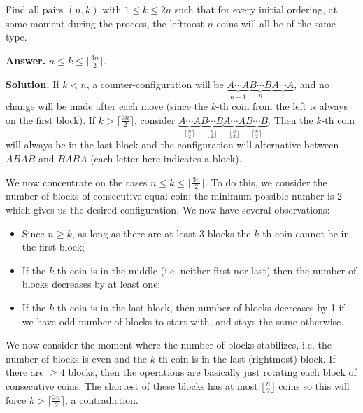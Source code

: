 \documentclass[11pt,a4paper]{article}
\begin{document}
\begin{enumerate}
    	Find all pairs $(n,k)$ with $1 \leq k \leq 2n$ such that for every initial ordering, at some moment during the process, the leftmost $n$ coins will all be of the same type.
    	
    	\textbf{Answer.} 
    	$n\le k\le \lceil \frac {3n}{2}\rceil$. 
    	
    	\textbf{Solution.} 
    	If $k < n$, a counter-configuration will be $\underbrace{A\cdots A}_{n - 1} \underbrace{B\cdots B}_{n} \underbrace{A\cdots A}_{1}$, 
    	and no change will be made after each move (since the $k$-th coin from the left is always on the first block). 
    	If $k > \lceil \frac {3n}{2}\rceil$, 
    	consider $\underbrace{A\cdots A}_{\lceil \frac n2\rceil}
    	\underbrace{B\cdots B}_{\lfloor \frac n2\rfloor}
    	\underbrace{A\cdots A}_{\lfloor \frac n2\rfloor}
    	\underbrace{B\cdots B}_{\lceil \frac n2\rceil}$. 
    	Then the $k$-th coin will always be in the last block 
    	and the configuration will alternative between $ABAB$ and $BABA$ (each letter here indicates a block). 
    	
    	We now concentrate on the cases $n\le k\le \lceil \frac {3n}{2}\rceil$. 
    	To do this, we consider the number of blocks of consecutive equal coin; 
    	the minimum possible number is 2 which gives us the desired configuration. 
    	We now have several observations: 
    	\begin{itemize}
    		\item Since $n\ge k$, as long as there are at least 3 blocks the $k$-th coin cannot be in the first block; 
    		
    		\item If the $k$-th coin is in the middle (i.e. neither first nor last) then the number of blocks decreases by at least one; 
    		
    		\item If the $k$-th coin is in the last block, then number of blocks decreases by 1 if we have odd number of blocks to start with, 
    		and stays the same otherwise. 
    	\end{itemize}
        
        We now consider the moment where the number of blocks stabilizes, i.e. the number of blocks is even and the $k$-th coin is in the last (rightmost) block. 
        If there are $\ge 4$ blocks, 
        then the operations are basically just rotating each block of consecutive coins. 
        The shortest of these blocks has at most $\lfloor \frac n2\rfloor$ coins so this will force $k > \lceil \frac {3n}{2}\rceil$, 
        a contradiction. 
    	

\end{enumerate}
\end{document}
